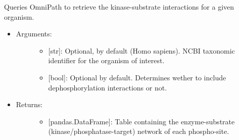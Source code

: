 \documentclass[letterpaper,10pt,english]{sphinxmanual}
\begin{document}
\begin{fulllineitems}
\label{\detokenize{databases:data_tools.databases.op_kinase_substrate}}
Queries OmniPath to retrieve the kinase-substrate interactions for a
given organism.
\begin{itemize}
\item {} \begin{description}
\item[{Arguments:}] \leavevmode\begin{itemize}
\item {} 
 {[}str{]}: Optional,  by default (Homo
sapiens). NCBI taxonomic identifier for the organism of
interest.

\item {} 
 {[}bool{]}: Optional  by default.
Determines wether to include dephosphorylation interactions or
not.

\end{itemize}

\end{description}

\item {} \begin{description}
\item[{Returns:}] \leavevmode\begin{itemize}
\item {} 
{[}pandas.DataFrame{]}: Table containing the enzyme-substrate
(kinase/phosphatase-target) network of each phospho-site.

\end{itemize}

\end{description}

\end{itemize}

\end{fulllineitems}

\end{document}
